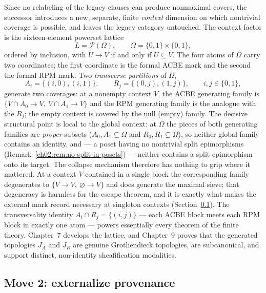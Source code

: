 Since no relabeling of the legacy clauses can produce nonmaximal covers, the
successor introduces a new, separate, finite \emph{context} dimension on
which nontrivial coverage is possible, and leaves the legacy category
untouched. The context factor is the sixteen-element powerset lattice
\[
L = \mathcal{P}(\Omega), \qquad \Omega = \{0,1\} \times \{0,1\},
\]
ordered by inclusion, with $U \to V$ if and only if $U \subseteq V$. The
four atoms of $\Omega$ carry two coordinates; the first coordinate is the
formal ACBE mark and the second the formal RPM mark. Two \emph{transverse
partitions} of $\Omega$,
\[
A_i = \{(i,0),(i,1)\}, \qquad R_j = \{(0,j),(1,j)\}, \qquad i,j \in \{0,1\},
\]
generate two coverages: at a nonempty context $V$, the ACBE generating
family is $\{V \cap A_0 \to V,\ V \cap A_1 \to V\}$ and the RPM generating
family is the analogue with the $R_j$; the empty context is covered by the
null (empty) family. The decisive structural point is local to the global
context: at $\Omega$ the pieces of both generating families are
\emph{proper} subsets ($A_0, A_1 \subsetneq \Omega$ and
$R_0, R_1 \subsetneq \Omega$), so neither global family contains an
identity, and --- a poset having no nontrivial split epimorphisms
(Remark~\ref{ch02:rem:no-split-in-posets}) --- neither contains a split
epimorphism onto its target. The collapse mechanism therefore has nothing
to grip where it mattered. At a context $V$ contained in a single block the
corresponding family degenerates to $\{V \to V,\ \varnothing \to V\}$ and
does generate the maximal sieve; that degeneracy is harmless for the escape
theorem, and it is exactly what makes the external mark record necessary at
singleton contexts (Section~\ref{ch01:sec:move2}). The transversality identity
$A_i \cap R_j = \{(i,j)\}$ --- each ACBE block meets each RPM block in
exactly one atom --- powers essentially every theorem of the finite theory.
Chapter~7 develops the lattice, and Chapter~9 proves that the generated
topologies $J_A$ and $J_R$ are genuine Grothendieck topologies, are
subcanonical, and support distinct, non-identity sheafification modalities.

\subsection{Move 2: externalize provenance}\label{ch01:sec:move2}

